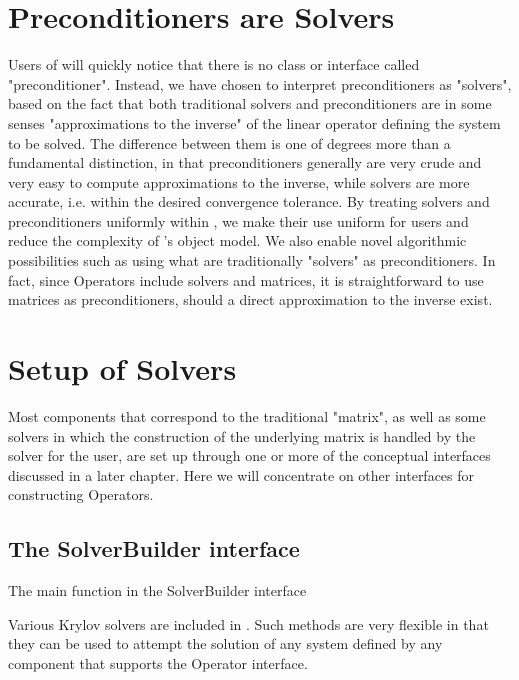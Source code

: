 \section{Preconditioners are Solvers}

Users of \hypre{} will quickly notice that there is
no class or interface called 
"preconditioner". Instead, we have chosen to interpret preconditioners as
"solvers", based on the fact that 
both traditional solvers and preconditioners are in some senses "approximations
to the inverse" of the linear 
operator defining the system to be solved. The difference between them is one
of degrees more than a fundamental distinction, in that 
preconditioners generally are very crude and very easy to compute
approximations to the inverse, while 
solvers are more accurate, i.e. within the desired convergence tolerance. By
treating solvers and 
preconditioners uniformly within \hypre{}, we make their use uniform for users and
reduce the complexity 
of \hypre{}'s object model. We also enable novel algorithmic possibilities such as
using what are 
traditionally "solvers" as preconditioners. In fact, since Operators include
solvers and matrices, it is 
straightforward to use matrices as preconditioners, should a direct
approximation to the inverse exist. 

\section{Setup of Solvers}

Most components that correspond to the traditional "matrix", as well as
some solvers in which the 
construction of the underlying matrix is handled by the solver for the user,
are set up through one or more 
of the conceptual interfaces discussed in a later chapter. Here we will
concentrate on other interfaces for
constructing Operators.

\subsection{The SolverBuilder interface}

The main function in the SolverBuilder interface


Various Krylov solvers are included in \hypre{}.
Such methods are very flexible in that they can be used to attempt
the solution of any system defined by any component that supports the
Operator interface.
